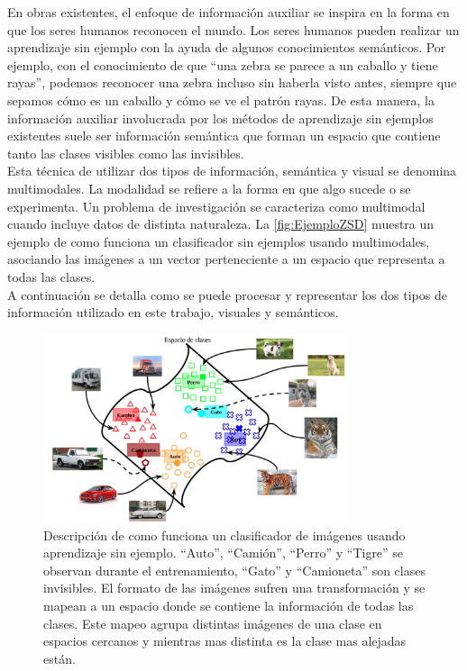 En obras existentes, el enfoque de información auxiliar se inspira en la forma en que los seres humanos reconocen el mundo. Los seres humanos pueden realizar un aprendizaje sin ejemplo con la ayuda de algunos conocimientos semánticos. Por ejemplo, con el conocimiento de que ``una zebra se parece a un caballo y tiene rayas'', podemos reconocer una zebra incluso sin haberla visto antes, siempre que sepamos cómo es un caballo y cómo se ve el patrón rayas. De esta manera, la información auxiliar involucrada por los métodos de aprendizaje sin ejemplos existentes suele ser información semántica que forman un espacio que contiene tanto las clases visibles como las invisibles.\\

Esta técnica de utilizar dos tipos de información, semántica y visual se denomina multimodales. La modalidad se refiere a la forma en que algo sucede o se experimenta. Un problema de investigación se caracteriza como multimodal cuando incluye datos de distinta naturaleza. La \autoref{fig:EjemploZSD} muestra un ejemplo de como funciona un clasificador sin ejemplos usando multimodales, asociando las imágenes a un vector perteneciente a un espacio que representa a todas las clases.\\

A continuación se detalla como se puede procesar y representar los dos tipos de información utilizado en este trabajo, visuales y semánticos.

\begin{figure}[]
	\centering
	\includegraphics[width=0.8\textwidth]{img/Modelo.png}
	\caption{Descripción de como funciona un clasificador de imágenes usando aprendizaje sin ejemplo. ``Auto'', ``Camión'', ``Perro'' y ``Tigre'' se observan  durante el entrenamiento,  ``Gato'' y ``Camioneta'' son clases invisibles. El formato de las imágenes sufren una transformación y se mapean a un espacio donde se contiene la información de todas las clases. Este mapeo agrupa distintas imágenes de una clase en espacios cercanos y mientras mas distinta es la clase mas alejadas están.}
	\label{fig:EjemploZSD}
\end{figure}


